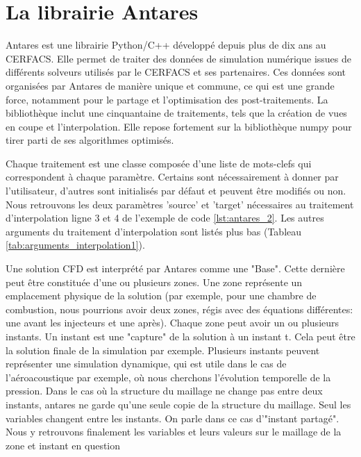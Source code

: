\section{La librairie Antares}

Antares est une librairie Python/C++ développé depuis plus de dix ans au CERFACS. Elle permet de traiter des données de simulation numérique issues de différents solveurs utilisés par le CERFACS et ses partenaires. Ces données sont organisées par Antares de manière unique et commune, ce qui est une grande force, notamment pour le partage et l'optimisation des post-traitements.
La bibliothèque inclut une cinquantaine de traitements, tels que la création de vues en coupe et l'interpolation.
Elle repose fortement sur la bibliothèque numpy pour tirer parti de ses algorithmes optimisés. %




Chaque traitement est une classe composée d'une liste de mots-clefs qui correspondent à chaque paramètre. Certains sont nécessairement à donner par l'utilisateur, d'autres sont initialisés par défaut et peuvent être modifiés ou non. Nous retrouvons les deux paramètres 'source' et 'target' nécessaires au traitement d'interpolation ligne 3 et 4 de l'exemple de code \ref{lst:antares_2}. Les autres arguments du traitement d'interpolation sont listés plus bas (Tableau \ref{tab:arguments_interpolation1}).


Une solution CFD est interprété par Antares comme une "Base".
Cette dernière peut être constituée d'une ou plusieurs zones.
Une zone représente un emplacement physique de la solution (par exemple, pour une chambre de combustion, nous pourrions avoir deux zones, régis avec des équations différentes: une avant les injecteurs et une après). %
Chaque zone peut avoir un ou plusieurs instants.
Un instant est une "capture" de la solution à un instant t. Cela peut être la solution finale de la simulation par exemple. Plusieurs instants peuvent représenter une simulation dynamique, qui est utile dans le cas de l'aéroacoustique par exemple, où nous cherchons l'évolution temporelle de la pression.
Dans le cas où la structure du maillage ne change pas entre deux instants, antares ne garde qu'une seule copie de la structure du maillage. Seul les variables changent entre les instants. On parle dans ce cas d'"instant partagé".\label{instants_partages}
Nous y retrouvons finalement les variables et leurs valeurs sur le maillage de la zone et instant en question

